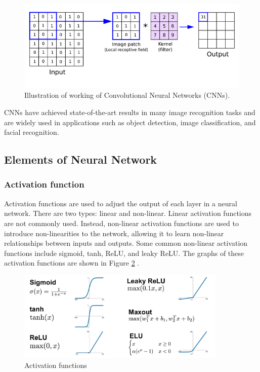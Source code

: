 \documentclass{book}
\begin{document}
	\begin{figure}[h!]
		\centering
		\includegraphics[width=0.7\columnwidth]{resources/chapter3/cnn2.png}
		\caption{Illustration of working of Convolutional Neural Networks (CNNs). \cite{reynolds2023convolutional}}
		\label{fig:CNN2}
	\end{figure}
	
	CNNs have achieved state-of-the-art results in many image recognition tasks and are widely used in applications such as object detection, image classification, and facial recognition.
	
	\subsection{Elements of Neural Network}
	\subsubsection{Activation function}
	
	Activation functions are used to adjust the output of each layer in a neural network. There are two types: linear and non-linear. Linear activation functions are not commonly used. Instead, non-linear activation functions are used to introduce non-linearities to the network, allowing it to learn non-linear relationships between inputs and outputs. Some common non-linear activation functions include sigmoid, tanh, ReLU, and leaky ReLU. The graphs of these activation functions are shown in Figure \ref{fig:Activation_functions} \cite{image2023, szandala2021review}.
	
	\begin{figure}[h!]
		\centering
		\includegraphics[width=100mm]{resources/chapter3/activation_functions.png}
		\caption{Activation functions}
		\label{fig:Activation_functions}
	\end{figure}
	
\end{document}
